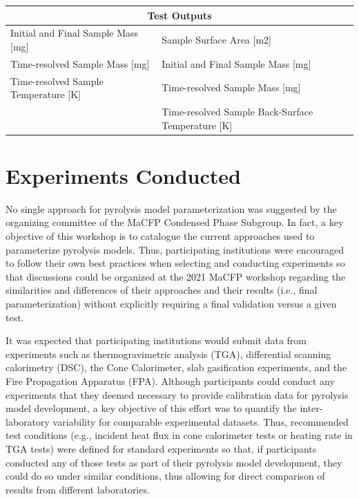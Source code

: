 \documentclass{book}
\begin{document}
\begin{table}[ht]
\begin{center}
\begin{tabular}{ll}
\multicolumn{2}{c}{Test Outputs}                                                                         \\ \hline
Initial and Final Sample Mass [mg]                & Sample Surface Area [m2]                             \\
Time-resolved Sample Mass [mg]                    & Initial and Final Sample Mass [mg]                   \\
Time-resolved Sample Temperature [K]              & Time-resolved Sample Mass [mg]                       \\
                                                  & Time-resolved Sample Back-Surface Temperature [K]    \\
\end{tabular}
\end{center}
\end{table}



\chapter{Experiments Conducted}

No single approach for pyrolysis model parameterization was suggested by the organizing committee of the MaCFP Condensed Phase Subgroup. In fact, a key objective of this workshop is to catalogue the current approaches used to parameterize pyrolysis models. Thus, participating institutions were encouraged to follow their own best practices when selecting and conducting experiments so that discussions could be organized at the 2021 MaCFP workshop regarding the similarities and differences of their approaches and their results (i.e., final parameterization) without explicitly requiring a final validation versus a given test.

It was expected that participating institutions would submit data from experiments such as thermogravimetric analysis (TGA), differential scanning calorimetry (DSC), the Cone Calorimeter, slab gasification experiments, and the Fire Propagation Apparatus (FPA). Although participants could conduct any experiments that they deemed necessary to provide calibration data for pyrolysis model development, a key objective of this effort was to quantify the inter-laboratory variability for comparable experimental datasets. Thus, recommended test conditions (e.g., incident heat flux in cone calorimeter tests or heating rate in TGA tests) were defined for standard experiments so that, if participants conducted any of those tests as part of their pyrolysis model development, they could do so under similar conditions, thus allowing for direct comparison of results from different laboratories.
\end{document}
